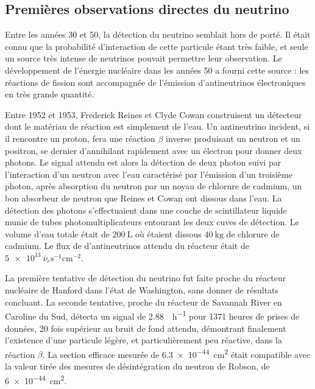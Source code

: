         \subsection{Premières observations directes du neutrino}
        
	        Entre les années 30 et 50, la détection du neutrino semblait hors de porté. Il était connu que la probabilité d'interaction de cette particule étant très faible, et seule un source très intense de neutrinos pouvait permettre leur observation. Le développement de l'énergie nucléaire dans les années 50 a fourni cette source : les réactions de fission sont accompagnée de l'émission d'antineutrinos électroniques en très grande quantité.
	        
	        Entre 1952 et 1953, Frederick Reines et Clyde Cowan construisent un détecteur dont le matériau de réaction est simplement de l'eau. Un antineutrino incident, si il rencontre un proton, fera une réaction $\beta$ inverse produisant un neutron et un positron, se dernier d'annihilant rapidement avec un électron pour donner deux photons. Le signal attendu est alors la détection de deux photon suivi par l'interaction d'un neutron avec l'eau caractérisé par l'émission d'un troisième photon, après absorption du neutron par un noyau de chlorure de cadmium, un bon absorbeur de neutron que Reines et Cowan ont dissous dans l'eau. La détection des photons s'effectuaient dans une couche de scintillateur liquide munie de tubes photomultiplicateurs entourant les deux cuves de détection. Le volume d'eau totale était de $\SI{200}{\liter}$ où étaient dissous $\SI{40}{\kilogram}$ de chlorure de cadmium. Le flux de d'antineutrinos attendu du réacteur était de $\SI{5e13}{\overline{\nu}_e\second^{-1}\centi\meter^{-2}}$\cite{ref_needed}.
	    
		    La première tentative de détection du neutrino fut faite proche du réacteur nucléaire de Hanford dans l'état de Washington, sans donner de résultats concluant. La seconde tentative, proche du réacteur de Savannah River en Caroline du Sud, détecta un signal de \SI{2.88}{\per\hour}\cite{Cowan1956} pour 1371 heures de prises de données, 20 fois supérieur au bruit de fond attendu, démontrant finalement l'existence d'une particule légère, et particulièrement peu réactive, dans la réaction $\beta$. La section efficace mesurée de  \SI{6.3e-44}{\centi\meter\squared} était compatible avec la valeur tirée des mesures de désintégration du neutron de Robson\cite{Robson1951}, de \SI{6e-44}{\centi\meter\squared}.
		    
